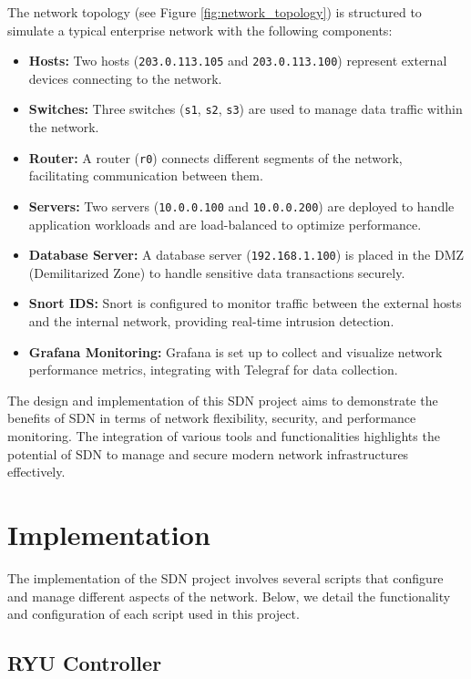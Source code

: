 \documentclass[a4paper,12pt]{article}
\begin{document}
The network topology (see Figure \ref{fig:network_topology}) is structured to simulate a typical enterprise network with the following components:

\begin{itemize}
    \item \textbf{Hosts:} Two hosts (\texttt{203.0.113.105} and \texttt{203.0.113.100}) represent external devices connecting to the network.
    \item \textbf{Switches:} Three switches (\texttt{s1}, \texttt{s2}, \texttt{s3}) are used to manage data traffic within the network.
    \item \textbf{Router:} A router (\texttt{r0}) connects different segments of the network, facilitating communication between them.
    \item \textbf{Servers:} Two servers (\texttt{10.0.0.100} and \texttt{10.0.0.200}) are deployed to handle application workloads and are load-balanced to optimize performance.
    \item \textbf{Database Server:} A database server (\texttt{192.168.1.100}) is placed in the DMZ (Demilitarized Zone) to handle sensitive data transactions securely.
    \item \textbf{Snort IDS:} Snort is configured to monitor traffic between the external hosts and the internal network, providing real-time intrusion detection.
    \item \textbf{Grafana Monitoring:} Grafana is set up to collect and visualize network performance metrics, integrating with Telegraf for data collection.
\end{itemize}

The design and implementation of this SDN project aims to demonstrate the benefits of SDN in terms of network flexibility, security, and performance monitoring. The integration of various tools and functionalities highlights the potential of SDN to manage and secure modern network infrastructures effectively.



\section{Implementation}

The implementation of the SDN project involves several scripts that configure and manage different aspects of the network. Below, we detail the functionality and configuration of each script used in this project.

\subsection{RYU Controller}
\end{document}
